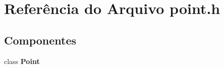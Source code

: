 \section{Referência do Arquivo point.\+h}
\label{point_8h}
\subsection*{Componentes}
\begin{DoxyCompactItemize}
\item 
class \textbf{ Point}
\end{DoxyCompactItemize}
